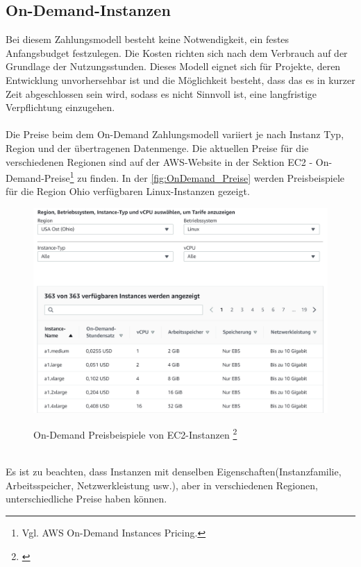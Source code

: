 \subsection{On-Demand-Instanzen}
Bei diesem Zahlungsmodell besteht keine Notwendigkeit, ein festes Anfangsbudget festzulegen. Die Kosten richten sich nach dem Verbrauch auf der Grundlage der Nutzungsstunden. Dieses Modell eignet sich für Projekte, deren Entwicklung unvorhersehbar ist und die Möglichkeit besteht, dass das es in kurzer Zeit abgeschlossen sein wird, sodass es nicht Sinnvoll ist, eine langfristige Verpflichtung einzugehen.
\\\\
Die Preise beim dem On-Demand Zahlungsmodell variiert je nach Instanz Typ, Region und der übertragenen Datenmenge. Die aktuellen Preise für die verschiedenen Regionen sind auf der AWS-Website in der Sektion EC2 - On-Demand-Preise\footnote{Vgl. AWS On-Demand Instances Pricing.\cite{AMZ02}} zu finden. 
In der \autoref{fig:OnDemand_Preise} werden Preisbeispiele für die Region Ohio verfügbaren Linux-Instanzen gezeigt.
\begin{figure}
    \centering
    \includegraphics[scale=0.5]{sources/On-Demand-Pläne für Amazon EC2}\label{fig:OnDemand_Preise}\\
    \caption[On-Demand Preise für Amazon EC2]{}
    \label{fig:OnDemand_Preise}  On-Demand Preisbeispiele von EC2-Instanzen \footnote{\cite{AMZ02}}
  \end{figure}
\\
Es ist zu beachten, dass Instanzen mit denselben Eigenschaften(Instanzfamilie, Arbeitsspeicher, Netzwerkleistung usw.), aber in verschiedenen Regionen, unterschiedliche Preise haben können.
